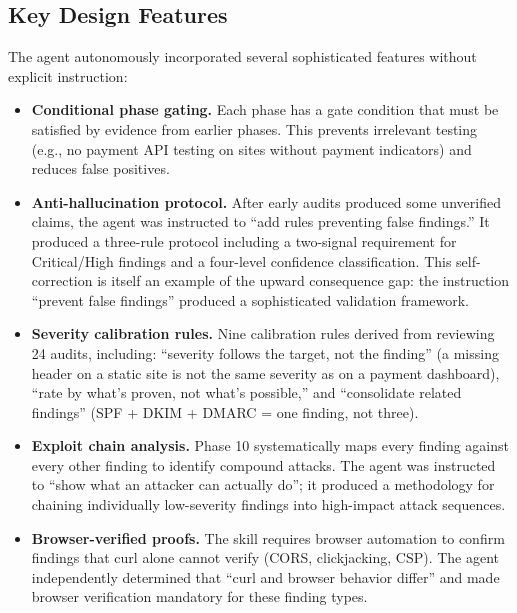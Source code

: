\documentclass[10pt]{article}
\begin{document}
\subsection{Key Design Features}

The agent autonomously incorporated several sophisticated features without explicit instruction:

\begin{itemize}[nosep,leftmargin=*]
\item \textbf{Conditional phase gating.} Each phase has a gate condition that must be satisfied by evidence from earlier phases. This prevents irrelevant testing (e.g., no payment API testing on sites without payment indicators) and reduces false positives.

\item \textbf{Anti-hallucination protocol.} After early audits produced some unverified claims, the agent was instructed to ``add rules preventing false findings.'' It produced a three-rule protocol including a two-signal requirement for Critical/High findings and a four-level confidence classification. This self-correction is itself an example of the upward consequence gap: the instruction ``prevent false findings'' produced a sophisticated validation framework.

\item \textbf{Severity calibration rules.} Nine calibration rules derived from reviewing 24 audits, including: ``severity follows the target, not the finding'' (a missing header on a static site is not the same severity as on a payment dashboard), ``rate by what's proven, not what's possible,'' and ``consolidate related findings'' (SPF + DKIM + DMARC = one finding, not three).

\item \textbf{Exploit chain analysis.} Phase 10 systematically maps every finding against every other finding to identify compound attacks. The agent was instructed to ``show what an attacker can actually do''; it produced a methodology for chaining individually low-severity findings into high-impact attack sequences.

\item \textbf{Browser-verified proofs.} The skill requires browser automation to confirm findings that curl alone cannot verify (CORS, clickjacking, CSP). The agent independently determined that ``curl and browser behavior differ'' and made browser verification mandatory for these finding types.
\end{itemize}
\end{document}

